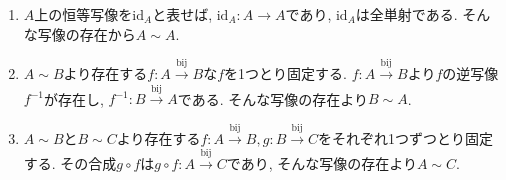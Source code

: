 \documentclass[a4j,dvipdfmx,10pt]{ujreport}
\makeatletter
\theoremstyle{mystyle}
\renewcommand{\proofname}{Proof}
\renewenvironment{proof}[1][\proofname]{\par
  \pushQED{\qed}%
  \normalfont \topsep6\p@\@plus6\p@\relax
  \trivlist
  \item[\hskip\labelsep
        \itshape
    {\bf\underline{#1}\@addpunct{\ }}]\ignorespaces
}{%
  \popQED\endtrivlist\@endpefalse
}
\newcommand{\map}[3]{#1\colon #2 \to #3}
\newcommand{\BijectionMap}[3]{
  #1\colon #2 \xrightarrow{\text{bij}} #3
}
\newcommand{\idmap}[1]{\mathrm{id}_{#1}}
\makeatother
\begin{document}
\begin{proof}
  \mbox{}
  \begin{enumerate}
    \item 
      $A$上の恒等写像を$\idmap{A}$と表せば,
      $\map{\idmap{A}}{A}{A}$であり,
      $\idmap{A}$は全単射である.
      そんな写像の存在から$A\sim A$.

    \item 
      $A\sim B$より存在する$\BijectionMap{f}{A}{B}$な$f$を1つとり固定する.
      $\BijectionMap{f}{A}{B}$より$f$の逆写像$f^{-1}$が存在し,
      $\BijectionMap{f^{-1}}{B}{A}$である.
      そんな写像の存在より$B\sim A$.

    \item 
      $A\sim B$と$B\sim C$より存在する$\BijectionMap{f}{A}{B},\BijectionMap{g}{B}{C}$をそれぞれ1つずつとり固定する.
      その合成$g\circ f$は$\BijectionMap{g\circ f}{A}{C}$であり,
      そんな写像の存在より$A\sim C$. \qedhere
  \end{enumerate}
\end{proof}

\renewcommand{\bibname}{参考文献}




\end{document}
